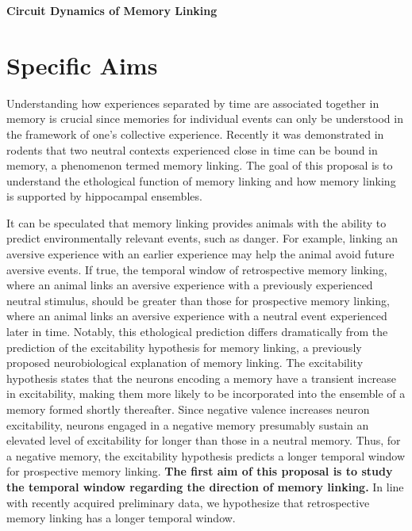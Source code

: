 \documentclass[master.tex]{subfiles}
\begin{document}
\begin{center}
  \vspace{1cm}
  {\huge \bfseries Circuit Dynamics of Memory Linking}
  \vspace{0.5cm}
\end{center}

\section*{Specific Aims}

Understanding how experiences separated by time are associated together in
memory is crucial since memories for individual events can only be understood in
the framework of one's collective experience. Recently it was demonstrated in
rodents that two neutral contexts experienced close in time can be bound in
memory, a phenomenon termed memory linking. The goal of this proposal is to
understand the ethological function of memory linking and how memory linking is
supported by hippocampal ensembles.

It can be speculated that memory linking provides animals with the ability to
predict environmentally relevant events, such as danger. For example, linking an
aversive experience with an earlier experience may help the animal avoid future
aversive events. If true, the temporal window of retrospective memory linking,
where an animal links an aversive experience with a previously experienced
neutral stimulus, should be greater than those for prospective memory linking,
where an animal links an aversive experience with a neutral event experienced
later in time. Notably, this ethological prediction differs dramatically from
the prediction of the excitability hypothesis for memory linking, a previously
proposed neurobiological explanation of memory linking. The excitability
hypothesis states that the neurons encoding a memory have a transient increase
in excitability, making them more likely to be incorporated into the ensemble of
a memory formed shortly thereafter. Since negative valence increases neuron
excitability, neurons engaged in a negative memory presumably sustain an
elevated level of excitability for longer than those in a neutral memory. Thus,
for a negative memory, the excitability hypothesis predicts a longer temporal
window for prospective memory linking. \textbf{The first aim of this proposal is
  to study the temporal window regarding the direction of memory linking.} In
line with recently acquired preliminary data, we hypothesize that retrospective
memory linking has a longer temporal window.
\end{document}
